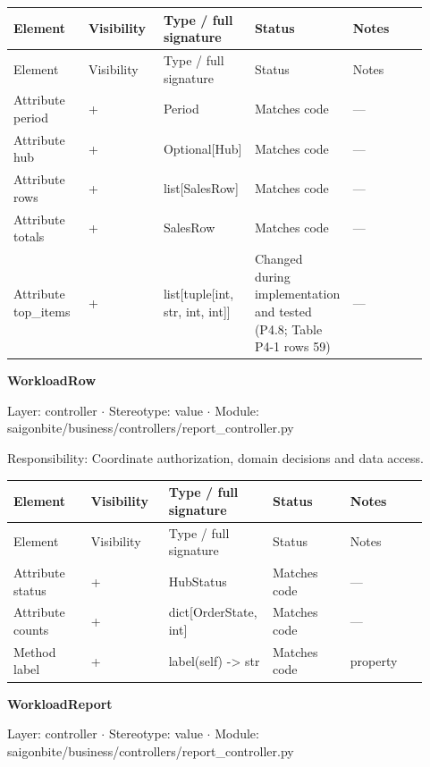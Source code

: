 \begin{longtable}{>{\raggedright\arraybackslash}p{0.1840\linewidth}>{\raggedright\arraybackslash}p{0.1840\linewidth}>{\raggedright\arraybackslash}p{0.1840\linewidth}>{\raggedright\arraybackslash}p{0.1840\linewidth}>{\raggedright\arraybackslash}p{0.1840\linewidth}}
Element & Visibility & Type / full signature & Status & Notes \\
\hline\endfirsthead
Element & Visibility & Type / full signature & Status & Notes \\
\hline\endhead
Attribute period & + & Period & Matches code & --- \\
Attribute hub & + & Optional[Hub] & Matches code & --- \\
Attribute rows & + & list[SalesRow] & Matches code & --- \\
Attribute totals & + & SalesRow & Matches code & --- \\
Attribute top\_items & + & list[tuple[int, str, int, int]] & Changed during implementation and tested (P4.8; Table P4-1 rows 59) & --- \\
\end{longtable}
\textbf{WorkloadRow}

Layer: controller \ensuremath{\cdot} Stereotype: \guillemotleft{}value\guillemotright{} \ensuremath{\cdot} Module: saigonbite/business/controllers/report\_controller.py

Responsibility: Coordinate authorization, domain decisions and data access.

\begin{longtable}{>{\raggedright\arraybackslash}p{0.1840\linewidth}>{\raggedright\arraybackslash}p{0.1840\linewidth}>{\raggedright\arraybackslash}p{0.1840\linewidth}>{\raggedright\arraybackslash}p{0.1840\linewidth}>{\raggedright\arraybackslash}p{0.1840\linewidth}}
Element & Visibility & Type / full signature & Status & Notes \\
\hline\endfirsthead
Element & Visibility & Type / full signature & Status & Notes \\
\hline\endhead
Attribute status & + & HubStatus & Matches code & --- \\
Attribute counts & + & dict[OrderState, int] & Matches code & --- \\
Method label & + & label(self) -\textgreater{} str & Matches code & property \\
\end{longtable}
\textbf{WorkloadReport}

Layer: controller \ensuremath{\cdot} Stereotype: \guillemotleft{}value\guillemotright{} \ensuremath{\cdot} Module: saigonbite/business/controllers/report\_controller.py

